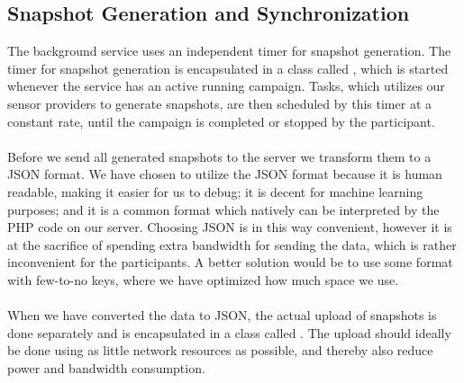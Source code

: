 \subsection{Snapshot Generation and Synchronization}
\label{sub:background_sensor_service_snapshot_generation_and_synchronization}


The background service uses an independent timer for snapshot generation. The timer for snapshot generation is encapsulated in a class called , which is started whenever the service has an active running campaign. Tasks, which utilizes our sensor providers to generate snapshots, are then scheduled by this timer at a constant rate, until the campaign is completed or stopped by the participant.
\\\\
Before we send all generated snapshots to the server we transform them to a JSON format. We have chosen to utilize the JSON format because it is human readable, making it easier for us to debug; it is decent for machine learning purposes; and it is a common format which natively can be interpreted by the PHP code on our server. Choosing JSON is in this way convenient, however it is at the sacrifice of spending extra bandwidth for sending the data, which is rather inconvenient for the participants. A better solution would be to use some format with few-to-no keys, where we have optimized how much space we use. 
\\\\
When we have converted the data to JSON, the actual upload of snapshots is done separately and is encapsulated in a class called . The upload should ideally be done using as little network resources as possible, and thereby also reduce power and bandwidth consumption. 
\\\\
